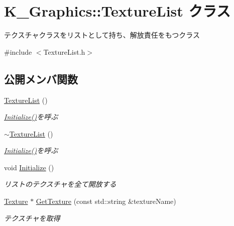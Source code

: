 \hypertarget{class_k___graphics_1_1_texture_list}{}\section{K\+\_\+\+Graphics\+:\+:Texture\+List クラス}
\label{class_k___graphics_1_1_texture_list}


テクスチャクラスをリストとして持ち、解放責任をもつクラス  




{\ttfamily \#include $<$Texture\+List.\+h$>$}

\subsection*{公開メンバ関数}
\begin{DoxyCompactItemize}
\item 
\mbox{\hyperlink{class_k___graphics_1_1_texture_list_a32733fdf9b63714a2730fccfe6d4d39b}{Texture\+List}} ()
\begin{DoxyCompactList}\small\item\em \mbox{\hyperlink{class_k___graphics_1_1_texture_list_a82c3a0615564dc2f016132b001093014}{Initialize()}}を呼ぶ \end{DoxyCompactList}\item 
\mbox{\hyperlink{class_k___graphics_1_1_texture_list_ad96337c9c60f13d1f6f9e088cab90ffc}{$\sim$\+Texture\+List}} ()
\begin{DoxyCompactList}\small\item\em \mbox{\hyperlink{class_k___graphics_1_1_texture_list_a82c3a0615564dc2f016132b001093014}{Initialize()}}を呼ぶ \end{DoxyCompactList}\item 
void \mbox{\hyperlink{class_k___graphics_1_1_texture_list_a82c3a0615564dc2f016132b001093014}{Initialize}} ()
\begin{DoxyCompactList}\small\item\em リストのテクスチャを全て開放する \end{DoxyCompactList}\item 
\mbox{\hyperlink{class_k___graphics_1_1_texture}{Texture}} $\ast$ \mbox{\hyperlink{class_k___graphics_1_1_texture_list_a71d4ef3f54b37dbc4b0c65e7b981678a}{Get\+Texture}} (const std\+::string \&texture\+Name)
\begin{DoxyCompactList}\small\item\em テクスチャを取得 \end{DoxyCompactList}\item 

\end{DoxyCompactItemize}
